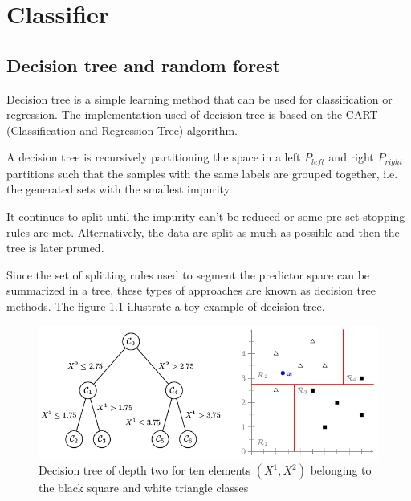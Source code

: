 \chapter{Classifier}  \label{sec:classifier}

%
%

\section{Decision tree and random forest}

Decision tree is a simple learning method that can be used for classification or regression. The implementation used of decision tree is based on the CART (Classification and Regression Tree) algorithm.

A decision tree is recursively partitioning the space in a left $P_{left}$ and right $P_{right}$ partitions such that the samples with the same labels are grouped together, i.e. the generated sets with the smallest impurity.

It continues to split until the impurity can't be reduced or some pre-set stopping rules are met. Alternatively, the data are split as much as possible and then the tree is later pruned.

Since the set of splitting rules used to segment the predictor space can be summarized in a tree, these types of approaches are known as decision tree methods. The figure  \ref{fig:decision_tree_simple_example} illustrate a toy example of decision tree.

\begin{figure}[h]
    \includegraphics[scale=0.5]{img/decision_tree_simple_example}
    \caption[Decision tree of for ten elements belonging to two classes]{Decision tree of depth two for ten elements $(X^1, X^2)$ belonging to the black square and white triangle classes}
    \label{fig:decision_tree_simple_example}
\end{figure}

